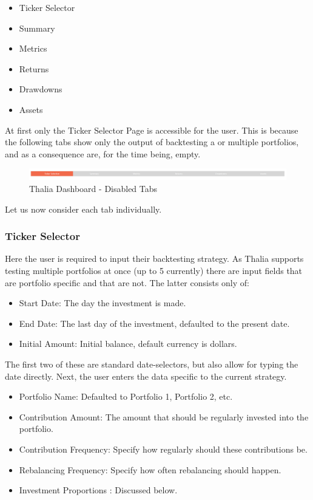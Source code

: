 \documentclass[main.tex]{subfiles}
\begin{document}
\begin{itemize}
    \item Ticker Selector
    \item Summary
    \item Metrics
    \item Returns 
    \item Drawdowns
    \item Assets
\end{itemize}

At first only the Ticker Selector Page is accessible for the user. 
This is because the following tabs show only the output of backtesting a or multiple portfolios, and as a consequence are, for the time being, empty.

\begin{figure}[H]
   \centering
   \includegraphics[width=\textwidth]{10Appendices/081User/081Pictures/disabled_tabs.png}
   \caption{Thalia Dashboard - Disabled Tabs}
   \label{thalia_disabled_tabs}
\end{figure}

Let us now consider each tab individually. 

\subsubsection*{Ticker Selector}

Here the user is required to input their backtesting strategy. As Thalia supports testing multiple portfolios at once (up to 5 currently) there are input fields that are 
portfolio specific and that are not. The latter consists only of:

\begin{itemize}
    \item Start Date: The day the investment is made.
    \item End Date: The last day of the investment, defaulted to the present date.
    \item Initial Amount: Initial balance, default currency is dollars.
\end{itemize}

The first two of these are standard date-selectors, but also allow for typing the date directly. Next, the user enters the data specific to the current strategy.

\begin{itemize}
    \item Portfolio Name: Defaulted to Portfolio 1, Portfolio 2, etc. 
    \item Contribution Amount: The amount that should be regularly invested into the portfolio.
    \item Contribution Frequency: Specify how regularly should these contributions be.
    \item Rebalancing Frequency: Specify how often rebalancing should happen. 
    \item Investment Proportions : Discussed below.
\end{itemize}
\end{document}
